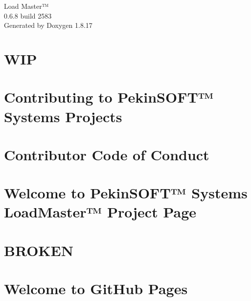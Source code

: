 \let\mypdfximage\pdfximage\def\pdfximage{\immediate\mypdfximage}\documentclass[twoside]{book}
\newcommand{\+}{\discretionary{\mbox{\scriptsize$\hookleftarrow$}}{}{}}
\newcommand{\clearemptydoublepage}{%
  \newpage{\pagestyle{empty}\cleardoublepage}%
}
\begin{document}
\hypersetup{pageanchor=false,
             bookmarksnumbered=true,
             pdfencoding=unicode
            }
\begin{titlepage}
\vspace*{7cm}
\begin{center}%
{\Large Load Master™ \\[1ex]\large 0.\+6.\+8 build 2583 }\\
\vspace*{1cm}
{\large Generated by Doxygen 1.8.17}\\
\end{center}
\end{titlepage}
\clearemptydoublepage
{}
\tableofcontents
\clearemptydoublepage
{}
\hypersetup{pageanchor=true}

\chapter{W\+IP}
\label{index}\hypertarget{index}{}
\chapter{Contributing to Pekin\+S\+O\+F\+T™ Systems Projects}
\label{md_Forked_CONTRIBUTING}

\chapter{Contributor Code of Conduct}
\label{md_Forked_LoadMaster_CODE-OF-CONDUCT}

\chapter{Welcome to Pekin\+S\+O\+F\+T™ Systems Load\+Master™ Project Page}
\label{md_Forked_LoadMaster_docs_index}

\chapter{B\+R\+O\+K\+EN}
\label{md_Forked_LoadMaster_broken_BROKEN}

\chapter{Welcome to Git\+Hub Pages}
\label{md_Forked_LoadMaster_broken_docs_index}

\end{document}
